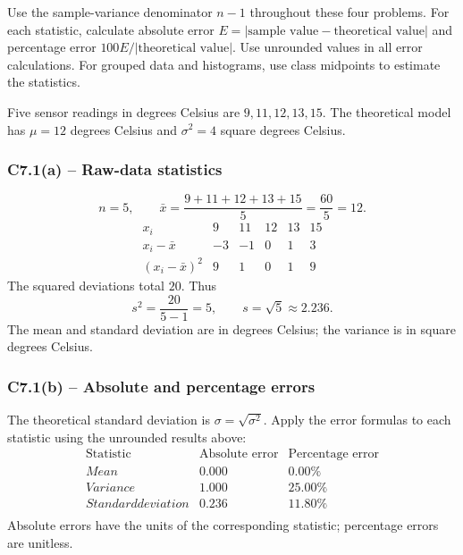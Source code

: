 Use the sample-variance denominator $n-1$ throughout these four problems.
For each statistic, calculate absolute error $E=|\text{sample value}-\text{theoretical value}|$
and percentage error $100E/|\text{theoretical value}|$. Use unrounded values in all error calculations.
For grouped data and histograms, use class midpoints to estimate the statistics.

{
Five sensor readings in degrees Celsius are $9,11,12,13,15$.
The theoretical model has $\mu=12$ degrees Celsius and
$\sigma^2=4$ square degrees Celsius.
\label{sol:c7-1a}
\subsubsection*{C7.1(a) -- Raw-data statistics }
\[
 n=5,\qquad\bar{x}=\frac{9+11+12+13+15}{5}=\frac{60}{5}=12.
\]
\[
\begin{array}{c|rrrrr}
x_i&9&11&12&13&15\\\hline
x_i-\bar{x}&-3&-1&0&1&3\\
(x_i-\bar{x})^2&9&1&0&1&9
\end{array}
\]
The squared deviations total $20$. Thus
\[
 s^2=\frac{20}{5-1}=5,\qquad s=\sqrt{5}\approx2.236.
\]
The mean and standard deviation are in degrees Celsius; the variance is
in square degrees Celsius.
\label{sol:c7-1b}
\subsubsection*{C7.1(b) -- Absolute and percentage errors }
The theoretical standard deviation is $\sigma=\sqrt{\sigma^2}$.
Apply the error formulas to each statistic using the unrounded results above:
\[
\begin{array}{l|rr}
\text{Statistic}&\text{Absolute error}&\text{Percentage error}\\\hline
Mean&0.000&0.00\%\\
Variance&1.000&25.00\%\\
Standard deviation&0.236&11.80\%\\
\end{array}
\]
Absolute errors have the units of the corresponding statistic; percentage errors are unitless.
\secInicio[sec:c7-1]

}
